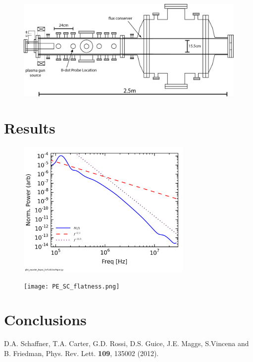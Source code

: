 \documentclass[aip,pop,amsmath,amssymb,reprint,superscriptaddress]{revtex4-1} %
\begin{document}
\begin{figure}
\centerline{
\includegraphics[width=17cm]{tunnel_2p5m_TurbDissDPPpaper.png}}
\caption{\label{fig:diagram}}
\end{figure}

\section{Results}

\begin{figure}
\centerline{
\includegraphics[width=8.5cm]{Young_spectra.png}}
\caption{\label{}}
\end{figure}

\begin{figure}
\centerline{
\texttt{[image: PE\_SC\_flatness.png]}}
\caption{\label{}}
\end{figure}

\section{Conclusions}


\providecommand{\noopsort}[1]{}\providecommand{\singleletter}[1]{#1}%
\begin{thebibliography}{10}

D.A. Schaffner, T.A. Carter, G.D. Rossi, D.S. Guice, J.E. Maggs, S.Vincena and B. Friedman, Phys. Rev. Lett. {\bf 109}, 135002 (2012).


\end{thebibliography}
\end{document}
